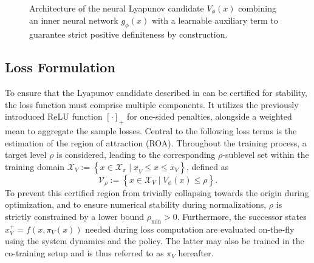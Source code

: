 \begin{figure}[htbp]
    \centering
    
    \caption[Neural Lyapunov architecture]{
        Architecture of the neural Lyapunov candidate $V_\phi(x)$ combining an inner neural network $g_\phi(x)$ 
        with a learnable auxiliary term to guarantee strict positive definiteness by construction.}
    \label{fig:neural-lyapunov}
\end{figure}



\subsection{Loss Formulation}
\label{subsec:lyapunov-formulation}
To ensure that the Lyapunov candidate described in  can be certified for stability, 
the loss function must comprise multiple components. 
It utilizes the previously introduced ReLU function $[\cdot]_+$ for one-sided penalties, 
alongside a weighted mean to aggregate the sample losses.
Central to the following loss terms is the estimation of the region of attraction (ROA). 
Throughout the training process, a target level $\rho$ is considered, leading to
the corresponding $\rho$-sublevel set within the training domain 
$\mathcal{X}_V := \left\{ x \in \mathcal{X}_\pi \mid \underline{x}_V \leq  x \leq \overline{x}_V \right\}$, 
defined as
\begin{equation}
    \label{eq:sublevel-set}
    \mathcal{V}_\rho := \left\{ x \in \mathcal{X}_V \mid V_\phi(x) \le \rho \right\}.
\end{equation}
To prevent this certified region from trivially collapsing towards the origin during optimization, 
and to ensure numerical stability during normalizations, $\rho$ is strictly constrained 
by a lower bound $\rho_{\mathrm{min}} > 0$.
Furthermore, the successor states $x^+_V = f(x, \pi_V(x))$ needed during loss computation are 
evaluated on-the-fly using the system dynamics and the policy. The latter may also be trained 
in the co-training setup and is thus referred to as $\pi_V$ hereafter.


